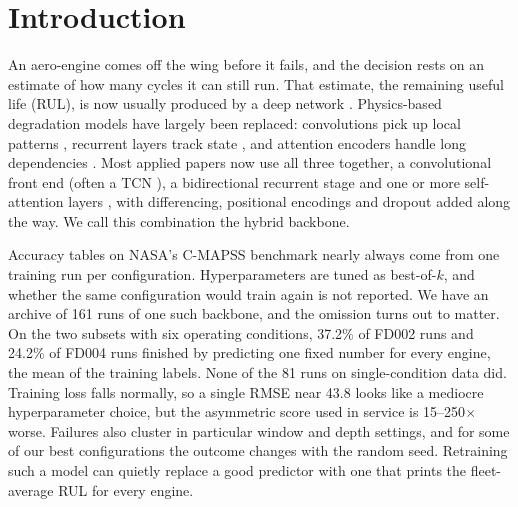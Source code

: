 \section{Introduction}
\label{sec:intro}

An aero-engine comes off the wing before it fails, and the decision rests on
an estimate of how many cycles it can still run. That estimate, the remaining
useful life (RUL), is now usually produced by a deep network
\cite{jardine2006review,saxena2008damage,lei2018machinery,hu2022prognostics}.
Physics-based degradation models have largely been replaced: convolutions
pick up local patterns \cite{babu2016deep,li2018remaining}, recurrent layers
track state \cite{zheng2017long,yuan2016fault,xiang2021multicellular}, and
attention encoders handle long dependencies
\cite{wang2024dvgtformer,zhang2024tatfa,kim2025dkam}. Most applied papers now
use all three together, a convolutional front end (often a TCN
\cite{bai2018empirical}), a bidirectional recurrent stage and one or more
self-attention layers \cite{vaswani2017attention}, with differencing,
positional encodings and dropout added along the way. We call this
combination the hybrid backbone.

Accuracy tables on NASA's C-MAPSS benchmark \cite{saxena2008damage} nearly
always come from one training run per configuration. Hyperparameters are
tuned as best-of-$k$, and whether the same configuration would train again
is not reported. We have an archive of 161 runs of one such backbone, and the
omission turns out to matter. On the two subsets with six operating
conditions, 37.2\% of FD002 runs and 24.2\% of FD004 runs finished by
predicting one fixed number for every engine, the mean of the training
labels. None of the 81 runs on single-condition data did. Training loss
falls normally, so a single RMSE near 43.8 looks like a mediocre
hyperparameter choice, but the asymmetric score used in service is
15--250$\times$ worse. Failures also cluster in particular window and depth
settings, and for some of our best configurations the outcome changes with
the random seed. Retraining such a model can quietly replace a good predictor
with one that prints the fleet-average RUL for every engine.

